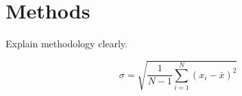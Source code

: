 \section{Methods}

Explain methodology clearly.

\begin{equation}
\sigma = \sqrt{\frac{1}{N-1} \sum_{i=1}^N (x_i - \bar{x})^2}
\end{equation}